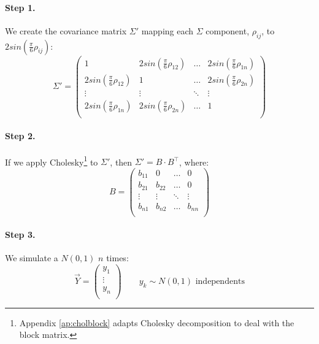 \documentclass[a4paper,12pt,final]{article}
\begin{document}
\paragraph{Step 1.} We create the covariance matrix $\Sigma'$ mapping each 
$\Sigma$ component, $\rho_{ij}$, to $2 sin(\frac{\pi}{6} \rho_{ij})$:
\begin{displaymath}
\Sigma' = \left( 
\begin{array}{cccc}
1                              & 2 sin(\frac{\pi}{6} \rho_{12}) & \ldots & 2 sin(\frac{\pi}{6} \rho_{1n}) \\
2 sin(\frac{\pi}{6} \rho_{12}) & 1                              & \ldots & 2 sin(\frac{\pi}{6} \rho_{2n}) \\
\vdots                         & \vdots                         & \ddots & \vdots                         \\
2 sin(\frac{\pi}{6} \rho_{1n}) & 2 sin(\frac{\pi}{6} \rho_{2n}) & \ldots & 1                              \\
\end{array}
\right)
\end{displaymath}

\paragraph{Step 2.} If we apply Cholesky\footnote{Appendix \ref{ap:cholblock} adapts Cholesky 
decomposition to deal with the block matrix.} to $\Sigma'$, then $\Sigma' = B \cdot B^{\top}$, 
where:
\begin{displaymath}
B = 
\left(
\begin{array}{cccc}
b_{11}   & 0        & \ldots & 0       \\
b_{21}   & b_{22}   & \ldots & 0       \\
\vdots  & \vdots  & \ddots & \vdots    \\
b_{n1}   & b_{n2}   & \ldots & b_{nn}  \\
\end{array}
\right)
\end{displaymath}

\paragraph{Step 3.} We simulate a $N(0,1)$ $n$ times:
\begin{displaymath}
\vec{Y} =
\left(
\begin{array}{c}
y_1    \\
\vdots \\
y_n    \\
\end{array}
\right) 
\qquad y_k \sim N(0,1) \textrm{ independents}
\end{displaymath}
\end{document}
